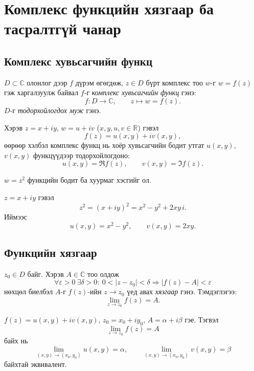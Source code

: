 \chapter{Комплекс функцийн хязгаар ба тасралтгүй чанар}

\section{Комплекс хувьсагчийн функц}

\begin{dfn}
$D\subset\mathbb{C}$ олонлог дээр $f$ дүрэм өгөгдөж, $z\in D$ бүрт комплекс тоо $w$-г
$w=f(z)$ гэж харгалзуулж байвал $f$-г \emph{комплекс хувьсагчийн функц} гэнэ:
\[
f: D\to \mathbb{C},\qquad z\mapsto w=f(z).
\]
$D$-г \emph{тодорхойлогдох муж} гэнэ.
\end{dfn}

Хэрэв $z=x+iy$, $w=u+iv$ ($x,y,u,v\in\mathbb{R}$) гэвэл
\[
f(z)=u(x,y)+iv(x,y),
\]
өөрөөр хэлбэл комплекс функц нь хоёр хувьсагчийн бодит утгат $u(x,y)$, $v(x,y)$ функцүүдээр тодорхойлогдоно:
\[
u(x,y)=\Re f(z),\qquad v(x,y)=\Im f(z).
\]

\begin{exm}
$w=z^2$ функцийн бодит ба хуурмаг хэсгийг ол.
\end{exm}

\begin{sol}
$z=x+iy$ гэвэл
\[
z^2=(x+iy)^2=x^2-y^2+2xy\,i.
\]
Иймээс
\[
u(x,y)=x^2-y^2,\qquad v(x,y)=2xy.
\]
\end{sol}


\section{Функцийн хязгаар}

\begin{dfn}
$z_0\in D$ байг. Хэрэв $A\in\mathbb{C}$ тоо олдож
\[
\forall \varepsilon>0\ \exists \delta>0:\ 
0<|z-z_0|<\delta \Rightarrow |f(z)-A|<\varepsilon
\]
нөхцөл биелбэл $A$-г $f(z)$-ийн $z\to z_0$ үед авах \emph{хязгаар} гэнэ.
Тэмдэглэгээ:
\[
\lim_{z\to z_0} f(z)=A.
\]
\end{dfn}

\begin{thm}
$f(z)=u(x,y)+iv(x,y)$, $z_0=x_0+iy_0$, $A=\alpha+i\beta$ гэе.
Тэгвэл
\[
\lim_{z\to z_0} f(z)=A
\]
байх нь
\[
\lim_{(x,y)\to(x_0,y_0)}u(x,y)=\alpha,\qquad
\lim_{(x,y)\to(x_0,y_0)}v(x,y)=\beta
\]
байхтай эквивалент.
\end{thm}

